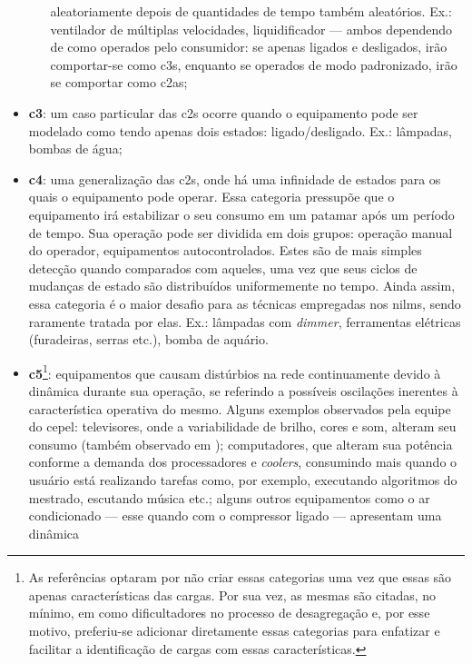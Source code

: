 \begin{itemize}
\begin{itemize}
aleatoriamente depois de quantidades de tempo também aleatórios. Ex.:
ventilador de múltiplas velocidades, liquidificador --- ambos
dependendo de como operados pelo consumidor: se apenas ligados e
desligados, irão comportar-se como \acs{c3}s, enquanto se
operados de modo padronizado, irão se comportar como \acs{c2a}s;
\end{itemize}
\item \textbf{\gls{c3}}: um caso particular das \glspl{c2} ocorre
quando o equipamento pode ser modelado como tendo apenas dois estados:
ligado/desligado. Ex.: lâmpadas, bombas de água;
\item \textbf{\Gls{c4}}: uma generalização das \glspl{c2}, onde
há uma infinidade de estados para os quais o equipamento pode operar.
Essa categoria pressupõe que o equipamento irá estabilizar o seu consumo
em um patamar após um período de tempo. Sua operação pode ser dividida
em dois grupos: operação manual do operador, equipamentos
autocontrolados. Estes são de mais simples detecção quando comparados
com aqueles, uma vez que seus ciclos de mudanças de estado são
distribuídos uniformemente no tempo. Ainda assim, essa categoria é o
maior desafio para as técnicas empregadas nos \glspl{nilm}, sendo
raramente tratada por elas. Ex.: lâmpadas com \emph{dimmer},
ferramentas elétricas (furadeiras, serras etc.), bomba de aquário.
\item \textbf{\Gls{c5}}\footnote{As referências optaram por não
criar essas categorias uma vez que essas são apenas
características das cargas. Por sua vez, as mesmas são citadas, no
mínimo, em \cite{nilm_zeifman_review_2011,nilm_liang_pt2_2010_40}
como dificultadores no processo de desagregação e, por esse motivo,
preferiu-se adicionar diretamente essas categorias para
enfatizar e facilitar a identificação de cargas com essas
características.\label{fn:categoria_add}}: equipamentos que causam
distúrbios na rede continuamente devido à dinâmica durante sua
operação, se referindo a possíveis oscilações inerentes à 
característica operativa do mesmo. Alguns exemplos observados pela
equipe do \gls{cepel}: televisores, onde a variabilidade de brilho,
cores e som, alteram seu consumo (também observado em
\cite{nilm_zeifman_statistical_naive_enduses_2013}); computadores, que
alteram sua potência conforme a demanda dos processadores e
\emph{coolers}, consumindo mais quando o usuário está realizando
tarefas como, por exemplo, executando algoritmos do mestrado,
escutando música etc.; alguns outros equipamentos como o ar condicionado
--- esse quando com o compressor ligado --- apresentam uma dinâmica

\end{itemize}
